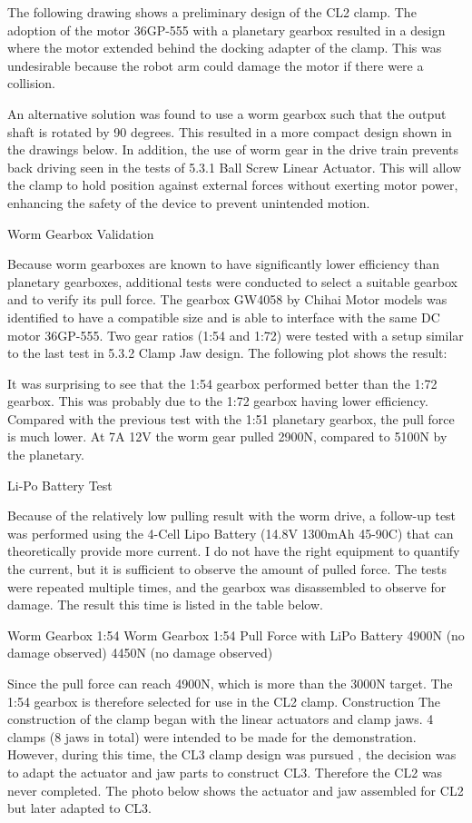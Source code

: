 The following drawing shows a preliminary design of the CL2 clamp. The adoption of the motor 36GP-555 with a planetary gearbox resulted in a design where the motor extended behind the docking adapter of the clamp. This was undesirable because the robot arm could damage the motor if there were a collision. 

An alternative solution was found to use a worm gearbox such that the output shaft is rotated by 90 degrees. This resulted in a more compact design shown in the drawings below. In addition, the use of worm gear in the drive train prevents back driving seen in the tests of 5.3.1 Ball Screw Linear Actuator. This will allow the clamp to hold position against external forces without exerting motor power, enhancing the safety of the device to prevent unintended motion.

Worm Gearbox Validation

Because worm gearboxes are known to have significantly lower efficiency than planetary gearboxes, additional tests were conducted to select a suitable gearbox and to verify its pull force. The gearbox GW4058 by Chihai Motor models was identified to have a compatible size and is able to interface with the same DC motor 36GP-555. Two gear ratios (1:54 and 1:72) were tested with a setup similar to the last test in 5.3.2 Clamp Jaw design. The following plot shows the result:

It was surprising to see that the 1:54 gearbox performed better than the 1:72 gearbox. This was probably due to the 1:72 gearbox having lower efficiency. Compared with the previous test with the 1:51 planetary gearbox, the pull force is much lower. At 7A 12V the worm gear pulled 2900N, compared to 5100N by the planetary.

Li-Po Battery Test

Because of the relatively low pulling result with the worm drive, a follow-up test was performed using the 4-Cell Lipo Battery (14.8V 1300mAh 45-90C) that can theoretically provide more current. I do not have the right equipment to quantify the current, but it is sufficient to observe the amount of pulled force. The tests were repeated multiple times, and the gearbox was disassembled to observe for damage. The result this time is listed in the table below. 


Worm Gearbox 1:54 
Worm Gearbox 1:54 
Pull Force with LiPo Battery
4900N (no damage observed)
4450N (no damage observed)

Since the pull force can reach 4900N, which is more than the 3000N target. The 1:54 gearbox is therefore selected for use in the CL2 clamp.
Construction 
The construction of the clamp began with the linear actuators and clamp jaws. 4 clamps (8 jaws in total) were intended to be made for the demonstration. However, during this time, the CL3 clamp design was pursued , the decision was to adapt the actuator and jaw parts to construct CL3. Therefore the CL2 was never completed. The photo below shows the actuator and jaw assembled for CL2 but later adapted to CL3.


